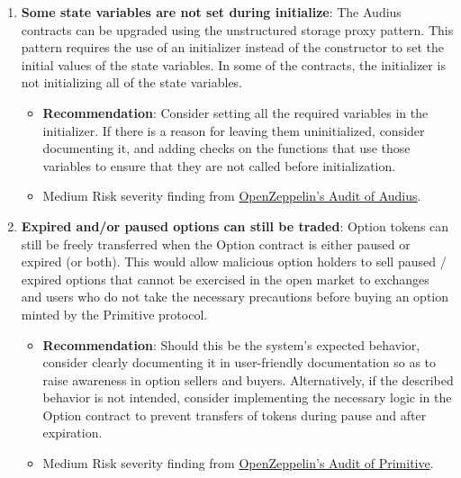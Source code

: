 \begin{enumerate}
\item\textbf{Some state variables are not set during initialize}: The Audius contracts can be upgraded using the unstructured storage proxy pattern. This pattern requires the use of an initializer instead of the constructor to set the initial values of the state variables. In some of the contracts, the initializer is not initializing all of the state variables.
	\begin{itemize}
	\item\textbf{Recommendation}: Consider setting all the required variables in the initializer. If there is a reason for leaving them uninitialized, consider documenting it, and adding checks on the functions that use those variables to ensure that they are not called before initialization.
	\item Medium Risk severity finding from \href{https://blog.openzeppelin.com/audius-contracts-audit/#medium}{OpenZeppelin’s Audit of Audius}.
	\end{itemize}

\item\textbf{Expired and/or paused options can still be traded}: Option tokens can still be freely transferred when the Option contract is either paused or expired (or both). This would allow malicious option holders to sell paused / expired options that cannot be exercised in the open market to exchanges and users who do not take the necessary precautions before buying an option minted by the Primitive protocol.
	\begin{itemize}
	\item\textbf{Recommendation}: Should this be the system’s expected behavior, consider clearly documenting it in user-friendly documentation so as to raise awareness in option sellers and buyers. Alternatively, if the described behavior is not intended, consider implementing the necessary logic in the Option contract to prevent transfers of tokens during pause and after expiration.
	\item Medium Risk severity finding from \href{https://blog.openzeppelin.com/primitive-audit/}{OpenZeppelin’s Audit of Primitive}.
	\end{itemize}


\end{enumerate}
